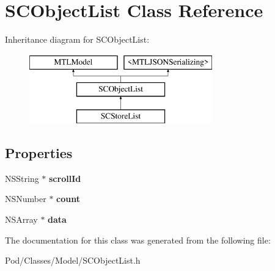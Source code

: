 \hypertarget{interface_s_c_object_list}{}\section{S\+C\+Object\+List Class Reference}
\label{interface_s_c_object_list}
Inheritance diagram for S\+C\+Object\+List\+:\begin{figure}[H]
\begin{center}
\leavevmode
\includegraphics[height=3.000000cm]{interface_s_c_object_list}
\end{center}
\end{figure}
\subsection*{Properties}
\begin{DoxyCompactItemize}
\item 
N\+S\+String $\ast$ {\bfseries scroll\+Id}\hypertarget{interface_s_c_object_list_a527cc638f6c959539c24325ef621e3fe}{}\label{interface_s_c_object_list_a527cc638f6c959539c24325ef621e3fe}

\item 
N\+S\+Number $\ast$ {\bfseries count}\hypertarget{interface_s_c_object_list_a57dac084a5fa2d8448f2e6fd0d293418}{}\label{interface_s_c_object_list_a57dac084a5fa2d8448f2e6fd0d293418}

\item 
N\+S\+Array $\ast$ {\bfseries data}\hypertarget{interface_s_c_object_list_ab0e683e5daf5aa0aadaac5d90ee69a7c}{}\label{interface_s_c_object_list_ab0e683e5daf5aa0aadaac5d90ee69a7c}

\end{DoxyCompactItemize}


The documentation for this class was generated from the following file\+:\begin{DoxyCompactItemize}
\item 
Pod/\+Classes/\+Model/S\+C\+Object\+List.\+h\end{DoxyCompactItemize}
